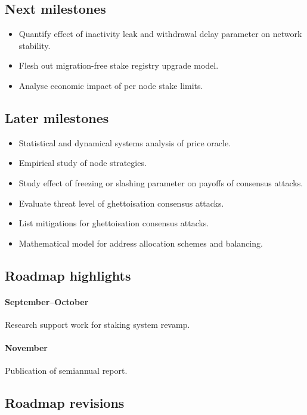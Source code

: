 \subsection*{Next milestones}

\begin{itemize}
  \item Quantify effect of inactivity leak and withdrawal delay parameter on network stability.
  \item Flesh out migration-free stake registry upgrade model.
  \item Analyse economic impact of per node stake limits.
\end{itemize}

\subsection*{Later milestones}
\begin{itemize}
  \item Statistical and dynamical systems analysis of price oracle.
  \item Empirical study of node strategies.
  \item Study effect of freezing or slashing parameter on payoffs of consensus attacks.
  \item Evaluate threat level of ghettoisation consensus attacks.
  \item List mitigations for ghettoisation consensus attacks.
  \item Mathematical model for address allocation schemes and balancing.
\end{itemize}


\subsection*{Roadmap highlights}

\paragraph{September--October}
%
Research support work for staking system revamp.

\paragraph{November}
%
Publication of semiannual report.


\subsection*{Roadmap revisions}

